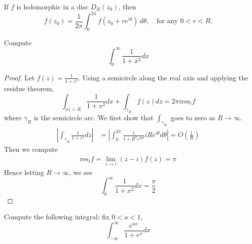 \documentclass[openany]{book}
\begin{document}
\begin{prop}
    If \( f \) is holomorphic in a disc \( D_R(z_0) \), then
    \[
    f(z_0) = \frac{1}{2\pi} \int_0^{2\pi} f(z_0 + re^{i\theta}) \, d\theta, \quad \text{for any } 0 < r < R.
    \]
\end{prop}

\begin{prob}
    Compute 
    \begin{equation*}
        \int_{0}^\infty\frac{1}{1+x^2}dx
    \end{equation*}
\end{prob}

\begin{proof}
    Let $f(z)=\frac{1}{1+z^2}$.
    Using a semicircle along the real axis and applying the residue theorem, 
    \begin{equation*}
        \int_{|x|<R}\frac{1}{1+x^2}dx+\int_{\gamma_R}f(z)dz=2\pi i \text{res}_if
    \end{equation*}
    where $\gamma_R$ is the semicircle arc. We first show that $\int_{\gamma_R}$ goes to zero as $R\to\infty$.
    \begin{align*}
        \left|\int_{\gamma_R}\frac{1}{1+z^2}dz\right|&=\left|\int_0^{2\pi}\frac{1}{1+R^2 e^{2i\theta}}iRe^{i\theta}d\theta \right|=O\left(\frac{1}{R}\right)
    \end{align*}
    Then we compute 
    \begin{align*}
        \text{res}_if=\lim_{z\to i}(z-i)f(z)=\pi
    \end{align*}
    Hence letting $R\to\infty$, we see 
    \begin{equation*}
        \int_0^\infty\frac{1}{1+x^2}dx=\frac{\pi}{2}
    \end{equation*}
\end{proof}




\begin{prob}
    Compute the following integral: fix $0<a<1$, 
    \begin{equation*}
        \int_{-\infty}^\infty\frac{e^{ax}}{1+e^x}dx
    \end{equation*}
\end{prob}
\end{document}
